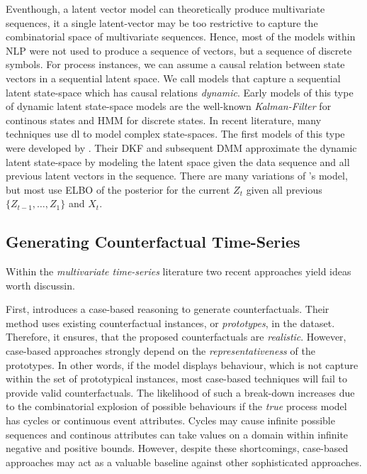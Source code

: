 \documentclass[12pt,a4paper]{report}
\begin{document}
Eventhough, a latent vector model can theoretically produce multivariate sequences, it a single latent-vector may be too restrictive to capture the combinatorial space of multivariate sequences. Hence, most of the models within \gls{NLP} were not used to produce a sequence of vectors, but a sequence of discrete symbols. For process instances, we can assume a causal relation between state vectors in a sequential latent space. We call models that capture a sequential latent state-space which has causal relations \emph{dynamic}\autocite{leglaive_RecurrentVariationalAutoencoder_2020}. Early models of this type of dynamic latent state-space models are the well-known \emph{Kalman-Filter} for continous states and \gls{HMM} for discrete states. In recent literature, many techniques use \gls{dl} to model complex state-spaces. The first models of this type were developed by \citeauthor{krishnan_StructuredInferenceNetworks_2017}. Their \gls{DKF} and subsequent \gls{DMM} approximate the dynamic latent state-space by modeling the latent space given the data sequence and all previous latent vectors in the sequence. There are many variations of \citeauthor{krishnan_StructuredInferenceNetworks_2017}'s model, but most use \gls{ELBO} of the posterior for the current $Z_{t}$ given all previous $\{Z_{t-1},\ldots,Z_{1}\}$ and $X_{t}$.

\subsection{Generating Counterfactual Time-Series}
Within the \emph{multivariate time-series} literature two recent approaches yield ideas worth discussin.

First, \citeauthor{delaney_InstanceBasedCounterfactualExplanations_2021} introduces a case-based reasoning to generate counterfactuals. Their method uses existing counterfactual instances, or \emph{prototypes}, in the dataset. Therefore, it ensures, that the proposed counterfactuals are \emph{realistic}. However, case-based approaches strongly depend on the \emph{representativeness} of the prototypes\needscite. In other words, if the model displays behaviour, which is not capture within the set of prototypical instances, most case-based techniques will fail to provide valid counterfactuals. The likelihood of such a break-down increases due to the combinatorial explosion of possible behaviours if the \emph{true} process model has cycles or continuous event attributes. Cycles may cause infinite possible sequences and continous attributes can take values on a domain within infinite negative and positive bounds. However, despite these shortcomings, case-based approaches may act as a valuable baseline against other sophisticated approaches.
\end{document}
